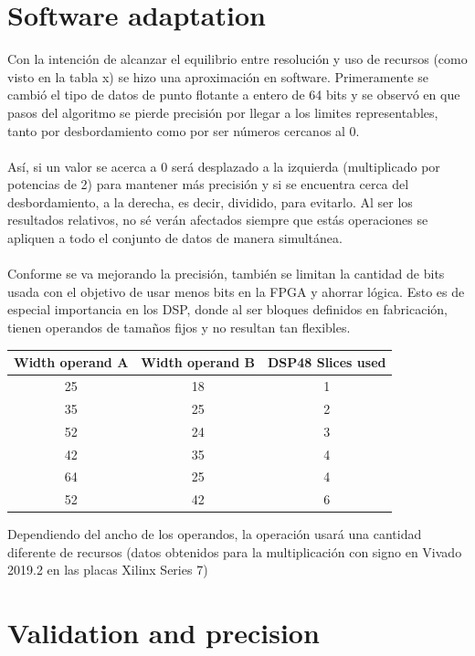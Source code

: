 \section{Software adaptation}
Con la intención de alcanzar el equilibrio entre resolución y uso de recursos (como visto en la tabla x) se hizo una aproximación en software. Primeramente se cambió el tipo de datos de punto flotante a entero de 64 bits y se observó en que pasos del algoritmo se pierde precisión por llegar a los limites representables, tanto por desbordamiento como por ser números cercanos al 0.
\\
\\
Así, si un valor se acerca a 0 será desplazado a la izquierda (multiplicado por potencias de 2) para mantener más precisión y si se encuentra cerca del desbordamiento, a la derecha, es decir, dividido, para evitarlo. Al ser los resultados relativos, no sé verán afectados siempre que estás operaciones se apliquen a todo el conjunto de datos de manera simultánea.
\\
\\
Conforme se va mejorando la precisión, también se limitan la cantidad de bits usada con el objetivo de usar menos bits en la FPGA y ahorrar lógica. Esto es de especial importancia en los DSP, donde al ser bloques definidos en fabricación, tienen operandos de tamaños fijos y no resultan tan flexibles.
\\
\begin{center}
 \begin{tabular}{|c c |c|} 
 \hline
 Width operand A & Width operand B & DSP48 Slices used \\ [0.5ex] 
 \hline\hline
 25 & 18 & 1 \\ 
 \hline
 35 & 25 & 2 \\
 \hline
 52 & 24 & 3 \\
 \hline
 42 & 35 & 4 \\
 \hline
 64 & 25 & 4 \\
 \hline
 52 & 42 & 6 \\ [1ex] 
 \hline
\end{tabular}
\end{center}
Dependiendo del ancho de los operandos, la operación usará una cantidad diferente de recursos (datos obtenidos para la multiplicación con signo en Vivado 2019.2 en las placas Xilinx Series 7)


\section{Validation and precision}

